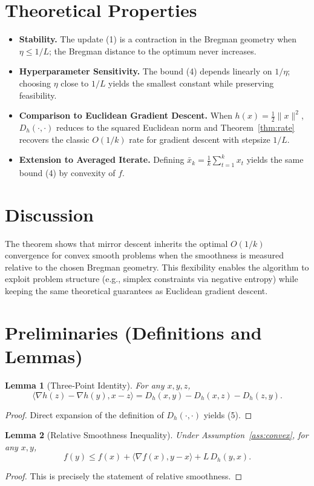 \documentclass{article}
\newtheorem{lemma}{Lemma}
\newcommand{\inner}[2]{\langle #1,#2\rangle}
\newcommand{\D}[2]{D_{h}(#1,#2)}
\newcommand{\grad}{\nabla}
\begin{document}
\section*{Theoretical Properties}
\begin{itemize}
\item \textbf{Stability.} The update (1) is a contraction in the Bregman geometry when $\eta\le 1/L$; the Bregman distance to the optimum never increases.
\item \textbf{Hyperparameter Sensitivity.} The bound (4) depends linearly on $1/\eta$; choosing $\eta$ close to $1/L$ yields the smallest constant while preserving feasibility.
\item \textbf{Comparison to Euclidean Gradient Descent.} When $h(x)=\tfrac12\|x\|^{2}$, $\D{\cdot}{\cdot}$ reduces to the squared Euclidean norm and Theorem~\ref{thm:rate} recovers the classic $O(1/k)$ rate for gradient descent with stepsize $1/L$.
\item \textbf{Extension to Averaged Iterate.} Defining $\bar x_{k}= \frac{1}{k}\sum_{t=1}^{k}x_t$ yields the same bound (4) by convexity of $f$.
\end{itemize}

\section*{Discussion}
The theorem shows that mirror descent inherits the optimal $O(1/k)$ convergence for convex smooth problems when the smoothness is measured relative to the chosen Bregman geometry.  This flexibility enables the algorithm to exploit problem structure (e.g., simplex constraints via negative entropy) while keeping the same theoretical guarantees as Euclidean gradient descent.

\newpage
\section*{Preliminaries (Definitions and Lemmas)}
\begin{lemma}[Three‑Point Identity]\label{lem:3pt}
For any $x,y,z$,
\[
\inner{\grad h(z)-\grad h(y)}{x-z}= \D{x}{y}-\D{x}{z}-\D{z}{y}. \tag{5}
\]
\end{lemma}
\begin{proof}
Direct expansion of the definition of $\D{\cdot}{\cdot}$ yields (5). \hfill\qedsymbol
\end{proof}

\begin{lemma}[Relative Smoothness Inequality]\label{lem:relSmooth}
Under Assumption~\ref{ass:convex}, for any $x,y$,
\[
f(y)\le f(x)+\inner{\grad f(x)}{y-x}+L\,\D{y}{x}. \tag{6}
\]
\end{lemma}
\begin{proof}
This is precisely the statement of relative smoothness. \hfill\qedsymbol
\end{proof}
\end{document}
